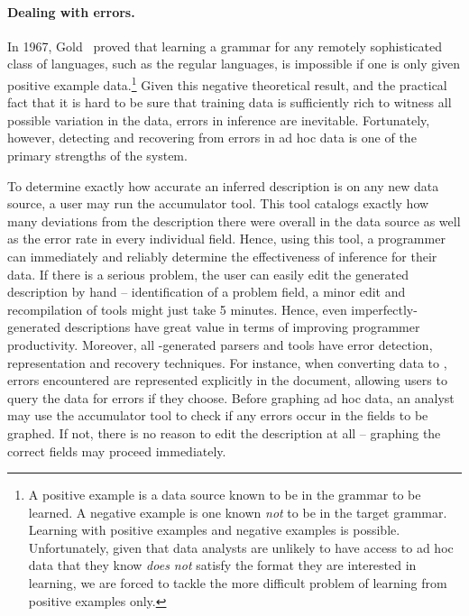 
\paragraph*{Dealing with errors.}  
In 1967, Gold~\cite{gold:inference}
proved that learning a grammar for any remotely
sophisticated class of languages, such as the regular languages, 
is impossible if one is only given positive 
example data.\footnote{A positive example is a data source
known to be in the grammar to be learned.  
A negative example is one known {\em not} to be in the target grammar.
Learning with positive examples and negative examples is possible.
Unfortunately, given that data analysts are unlikely to have access to
ad hoc data that they know {\em does not} 
satisfy the format they are interested in learning,
we are forced to tackle the more difficult problem of learning from 
positive examples only.}
Given this negative theoretical result, and the practical fact
that it is hard to be sure that training data
is sufficiently rich to witness all possible variation in the data,
errors in inference are inevitable.  Fortunately, however, detecting
and recovering from errors in ad hoc data is one of the primary strengths
of the \pads{} system.  

To determine exactly how accurate an
inferred description is on any new data source, a user may run the
accumulator tool.  This tool catalogs exactly how many deviations
from the description there were overall in the data source
as well as the error rate in every individual field.
Hence, using this tool, a programmer can immediately and reliably
determine the effectiveness of inference for their data.
If there is a serious 
problem, the user can easily edit the generated description by hand
-- identification of a problem field, a minor
edit and recompilation of tools might just take 5 minutes.  Hence,
even imperfectly-generated descriptions have great value in terms of
improving programmer productivity.  Moreover, all \pads{}-generated 
parsers and tools
have error detection, representation and recovery techniques.
For instance, when converting data to \xml{}, errors encountered
are represented explicitly in the \xml{} document, allowing users to query
the data for errors if they choose.  Before graphing ad hoc data,
an analyst may use the accumulator tool to check if any errors occur
in the fields to be graphed.  If not, there is no reason to edit
the description at all -- graphing the correct fields may proceed 
immediately.

